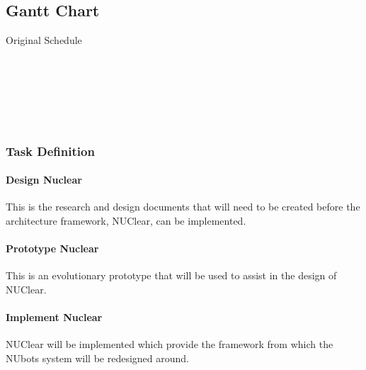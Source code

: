 \documentclass[english,12pt]{scrartcl}
\begin{document}
		\subsection{Gantt Chart}
			Original Schedule
			\begin{figure}[!ht]
				\scalebox{0.8} {
					\begin{ganttchart}[bar/.append style={orange}, link/.append style={thick}]{1}{23}
						 \\
						 \\
						 \\ %
						 \\ %
						 \ganttnewline %
						 \ganttnewline %
						 \ganttnewline %
						 \\ %
						 \ganttnewline %
					\end{ganttchart}
				}
			\end{figure}
			\subsubsection{Task Definition}
				\paragraph{Design Nuclear}
					This is the research and design documents that will need to be created before the architecture framework, NUClear, can be implemented.
				\paragraph{Prototype Nuclear}
					This is an evolutionary prototype that will be used to assist in the design of NUClear.
				\paragraph{Implement Nuclear}
					NUClear will be implemented which provide the framework from which the NUbots system will be redesigned around.
\end{document}
